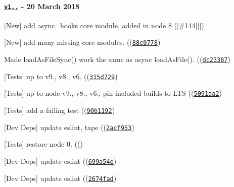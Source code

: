\paragraph*{\href{https://github.com/browserify/resolve/compare/v1.5.0...v1.6.0}{\tt v1..} -\/ 20 March 2018}


\begin{DoxyItemize}
\item \mbox{[}New\mbox{]} add {\ttfamily async\+\_\+hooks} core module, added in node 8 (\mbox{[}{\ttfamily \#144}\mbox{]}\mbox{[}\mbox{]})
\item \mbox{[}New\mbox{]} add many missing core modules. ((\href{https://github.com/browserify/resolve/commit/88c0778be359caaeb4ca74b24a7b5f7903bc39e8}{\tt {\ttfamily 88c0778}})
\item Made load\+As\+File\+Sync() work the same as async load\+As\+File(). ((\href{https://github.com/browserify/resolve/commit/dc23387adb93f497d67def7ee99fae48e5958fb3}{\tt {\ttfamily dc23387}})
\item \mbox{[}Tests\mbox{]} up to {\ttfamily v9.}, {\ttfamily v8.}, {\ttfamily v6.} ((\href{https://github.com/browserify/resolve/commit/315d729afe7074ffae5d6ca6509a73d747985d45}{\tt {\ttfamily 315d729}})
\item \mbox{[}Tests\mbox{]} up to {\ttfamily node} {\ttfamily v9.}, {\ttfamily v8.}, {\ttfamily v6.}; pin included builds to L\+TS ((\href{https://github.com/browserify/resolve/commit/5091aa2c076b67ff762937401e81da66ef7988ca}{\tt {\ttfamily 5091aa2}})
\item \mbox{[}Tests\mbox{]} add a failing test ((\href{https://github.com/browserify/resolve/commit/90b11921181c2783209e9aa31f1e20d98c11ed17}{\tt {\ttfamily 90b1192}})
\item \mbox{[}Dev Deps\mbox{]} update {\ttfamily eslint}, {\ttfamily tape} ((\href{https://github.com/browserify/resolve/commit/2acf953ce2a94b38528372b5f8848ac95a2aabe5}{\tt {\ttfamily 2acf953}})
\item \mbox{[}Tests\mbox{]} restore node 0. ((\href{https://github.com/browserify/resolve/commit/2764758aae576aef98f41af5d46f76ada3523012}{\tt {}})
\item \mbox{[}Dev Deps\mbox{]} update {\ttfamily eslint} ((\href{https://github.com/browserify/resolve/commit/699a54e91222dc8b3e1f0af8e9859c734d99d50a}{\tt {\ttfamily 699a54e}})
\item \mbox{[}Dev Deps\mbox{]} update {\ttfamily eslint} ((\href{https://github.com/browserify/resolve/commit/2674fadcfcf2b253fdcf5e9d8564fd2b23b0b57c}{\tt {\ttfamily 2674fad}})
\end{DoxyItemize}

